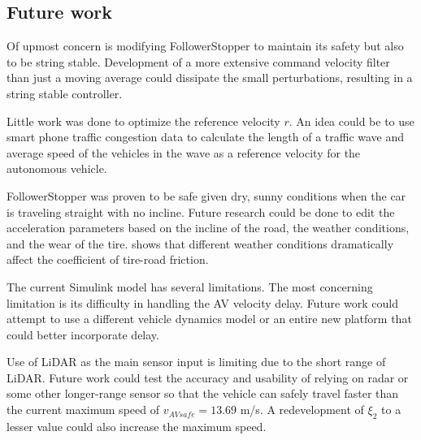 \documentclass[conference]{IEEEtran}
\begin{document}
\subsection{Future work}
Of upmost concern is modifying FollowerStopper to maintain its safety but also to be string stable. Development of a more extensive command velocity filter than just a moving average could dissipate the small perturbations, resulting in a string stable controller.

Little work was done to optimize the reference velocity $r$. An idea could be to use smart phone traffic congestion data to calculate the length of a traffic wave and average speed of the vehicles in the wave as a reference velocity for the autonomous vehicle.

FollowerStopper was proven to be safe given dry, sunny conditions when the car is traveling straight with no incline. Future research could be done to edit the acceleration parameters based on the incline of the road, the weather conditions, and the wear of the tire. \cite{muller2003estimation} shows that different weather conditions dramatically affect the coefficient of tire-road friction.

The current Simulink model has several limitations. The most concerning limitation is its difficulty in handling the AV velocity delay. Future work could attempt to use a different vehicle dynamics model or an entire new platform that could better incorporate delay. 

Use of LiDAR as the main sensor input is limiting due to the short range of LiDAR. Future work could test the accuracy and usability of relying on radar or some other longer-range sensor so that the vehicle can safely travel faster than the current maximum speed of $v_{AVsafe}=13.69$ m/s. A redevelopment of $\xi_2$ to a lesser value could also increase the maximum speed.







\vspace{12pt}



\end{document}

